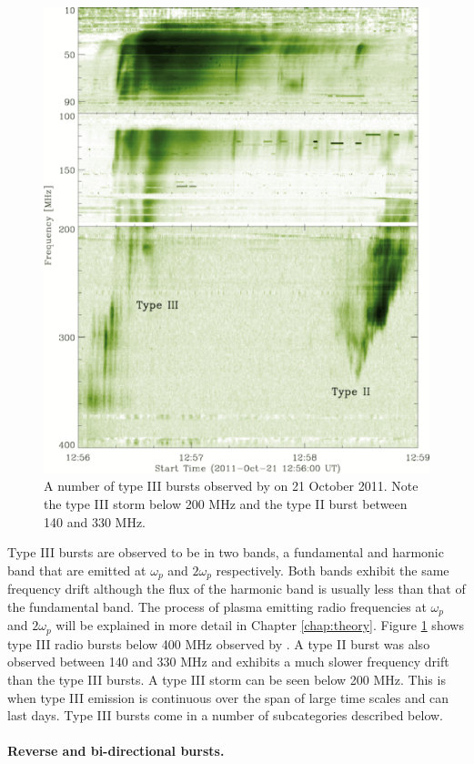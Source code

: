 \begin{figure}[ht]
    \centering
    \includegraphics[width=0.75\columnwidth]{Images/Pietro_typeIII.png}
    \caption[A number of type III bursts observed by \cite{Zucca2012} on 21 October 2011.]{A number of type III bursts observed by \cite{Zucca2012} on 21 October 2011. Note the type III storm below 200 MHz and the type II burst between 140 and 330 MHz.}
    \label{fig:bursts}
\end{figure}

Type III bursts are observed to be in two bands, a fundamental and harmonic band that are emitted at $\omega_p$ and $2 \omega_p$ respectively. Both bands exhibit the same frequency drift although the flux of the harmonic band is usually less than that of the fundamental band. The process of plasma emitting radio frequencies at $\omega_p$ and $2 \omega_p$ will be explained in more detail in Chapter \ref{chap:theory}. 
Figure \ref{fig:bursts} shows type III radio bursts below 400 MHz observed by \cite{Zucca2012}. A type II burst was also observed between 140 and 330 MHz and exhibits a much slower frequency drift than the type III bursts. A type III storm can be seen below 200 MHz. This is when type III emission is continuous over the span of large time scales and can last days. Type III bursts come in a number of subcategories described below.

\paragraph{Reverse and bi-directional bursts.}

